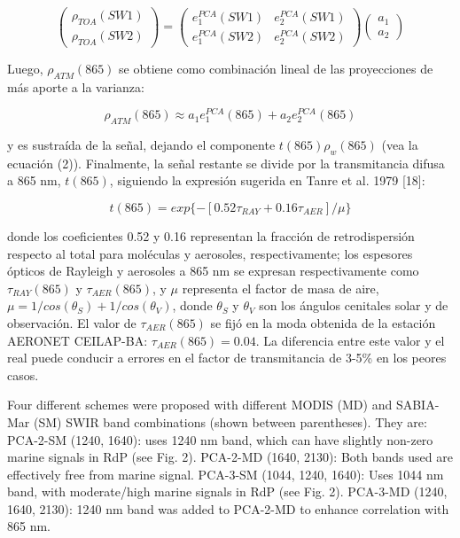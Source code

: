 \begin{equation}
    \begin{pmatrix}
    \rho_{TOA}(SW1)\\ 
    \rho_{TOA}(SW2)
    \end{pmatrix}
    = 
    \begin{pmatrix}
    e_{1}^{PCA}(SW1) & e_{2}^{PCA}(SW1)\\ 
    e_{1}^{PCA}(SW2) & e_{2}^{PCA}(SW2)
    \end{pmatrix}
    \begin{pmatrix}a_{1}\\ 
    a_{2}
    \end{pmatrix}
\end{equation}

Luego, $\rho_{ATM}(865)$ se obtiene como combinación lineal de las proyecciones de más aporte a la varianza:

\begin{equation}
    \rho_{ATM}(865) \approx a_{1}e_{1}^{PCA}(865) + a_{2}e_{2}^{PCA}(865)
\end{equation}

y es sustraída de la señal, dejando el componente $t(865)\rho_{w}(865)$ (vea la ecuación (2)).
Finalmente, la señal restante se divide por la transmitancia difusa a 865 nm, $t(865)$, siguiendo la expresión sugerida en Tanre et al. 1979 [18]:

\begin{equation}
t(865) = exp\{-[0.52\tau_{RAY} + 0.16\tau_{AER}]/\mu\}
\end{equation}


donde los coeficientes 0.52 y 0.16 representan la fracción de retrodispersión respecto al total para moléculas y aerosoles, respectivamente; los espesores ópticos de Rayleigh y aerosoles a 865 nm se expresan respectivamente como $ \tau_{RAY}(865)$ y $\tau_{AER}(865)$, y $\mu$ representa el factor de masa de aire, $\mu = 1/cos(\theta_{S}) + 1/cos(\theta_{V})$, donde $\theta_{S}$ y $\theta_{V}$ son los ángulos cenitales solar y de observación. El valor de $\tau_{AER}(865)$ se fijó en la moda obtenida de la estación AERONET CEILAP-BA: $\tau_{AER}(865)=0.04$. La diferencia entre este valor y el real puede conducir a errores en el factor de transmitancia de 3-5\% en los peores casos.


Four different schemes were proposed with different MODIS (MD) and SABIA-Mar (SM) SWIR band combinations (shown between parentheses). They are:
PCA-2-SM (1240, 1640): uses 1240 nm band, which can have slightly non-zero marine signals in RdP (see Fig. 2).
PCA-2-MD (1640, 2130): Both bands used are effectively free from marine signal. 
PCA-3-SM (1044, 1240, 1640): Uses 1044 nm band, with moderate/high marine signals in RdP (see Fig. 2).
PCA-3-MD (1240, 1640, 2130): 1240 nm band was added to PCA-2-MD to enhance correlation with 865 nm.

